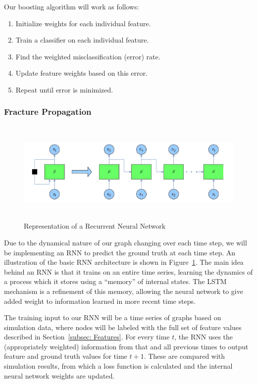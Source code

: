 Our boosting algorithm will work as follows:

\begin{enumerate}
    \item Initialize weights for each individual feature.
    \item Train a classifier on each individual feature.
    \item Find the weighted misclassification (error) rate.
    \item Update feature weights based on this error.
    \item Repeat until error is minimized.
\end{enumerate}


\subsubsection{Fracture Propagation}

\begin{figure}[!b]
    \centering
    \noindent
\includegraphics[width=12cm , height = 5cm]{rnn.PNG}
    \caption{Representation of a Recurrent Neural Network}
    \label{fig:rnn}
\end{figure}

Due to the dynamical nature of our graph changing over each time step, we will be implementing an RNN to predict the ground truth at each time step. An illustration of the basic RNN architecture is shown in Figure~\ref{fig:rnn}.  The main idea behind an RNN is that it trains on an entire time series, learning the dynamics of a process which it stores using a ``memory'' of internal states.  The LSTM mechanism is a refinement of this memory, allowing the neural network to give added weight to information learned in more recent time steps.

The training input to our RNN will be a time series of graphs based on simulation data, where nodes will be labeled with the full set of feature values described in Section~\ref{subsec: Features}.  For every time $t$, the RNN uses the (appropriately weighted) information from that and all previous times to output feature and ground truth values for time $t+1$.  These are compared with simulation results, from which a loss function is calculated and the internal neural network weights are updated.

